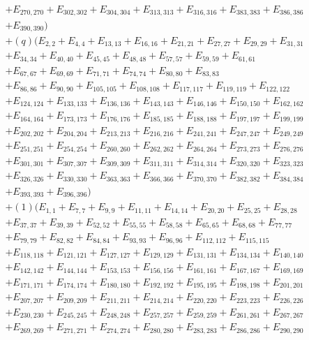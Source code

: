 \documentclass[pdftex]{sigma}
\numberwithin{equation}{section}
\theoremstyle{definition}
\begin{document}
\begin{align*}
&+E_{270,270}+E_{302,302}+E_{304,304}+E_{313,313}+E_{316,316}+E_{383,383}+E_{386,386}\\
&+E_{390,390})\\
&+(q)(E_{2,2}+E_{4,4}+E_{13,13}+E_{16,16}+E_{21,21}+E_{27,27}+E_{29,29}+E_{31,31}\\
&+E_{34,34}+E_{40,40}+E_{45,45}+E_{48,48}+E_{57,57}+E_{59,59}+E_{61,61}\\
&+E_{67,67}+E_{69,69}+E_{71,71}+E_{74,74}+E_{80,80}+E_{83,83}\\
&+E_{86,86}+E_{90,90}+E_{105,105}+E_{108,108}+E_{117,117}+E_{119,119}+E_{122,122}\\
&+E_{124,124}+E_{133,133}+E_{136,136}+E_{143,143}+E_{146,146}+E_{150,150}+E_{162,162}\\
&+E_{164,164}+E_{173,173}+E_{176,176}+E_{185,185}+E_{188,188}+E_{197,197}+E_{199,199}\\
&+E_{202,202}+E_{204,204}+E_{213,213}+E_{216,216}+E_{241,241}+E_{247,247}+E_{249,249}\\
&+E_{251,251}+E_{254,254}+E_{260,260}+E_{262,262}+E_{264,264}+E_{273,273}+E_{276,276}\\
&+E_{301,301}+E_{307,307}+E_{309,309}+E_{311,311}+E_{314,314}+E_{320,320}+E_{323,323}\\
&+E_{326,326}+E_{330,330}+E_{363,363}+E_{366,366}+E_{370,370}+E_{382,382}+E_{384,384}\\
&+E_{393,393}+E_{396,396})\\
&+(1)(E_{1,1}+E_{7,7}+E_{9,9}+E_{11,11}+E_{14,14}+E_{20,20}+E_{25,25}+E_{28,28}\\
&+E_{37,37}+E_{39,39}+E_{52,52}+E_{55,55}+E_{58,58}+E_{65,65}+E_{68,68}+E_{77,77}\\
&+E_{79,79}+E_{82,82}+E_{84,84}+E_{93,93}+E_{96,96}+E_{112,112}+E_{115,115}\\
&+E_{118,118}+E_{121,121}+E_{127,127}+E_{129,129}+E_{131,131}+E_{134,134}+E_{140,140}\\
&+E_{142,142}+E_{144,144}+E_{153,153}+E_{156,156}+E_{161,161}+E_{167,167}+E_{169,169}\\
&+E_{171,171}+E_{174,174}+E_{180,180}+E_{192,192}+E_{195,195}+E_{198,198}+E_{201,201}\\
&+E_{207,207}+E_{209,209}+E_{211,211}+E_{214,214}+E_{220,220}+E_{223,223}+E_{226,226}\\
&+E_{230,230}+E_{245,245}+E_{248,248}+E_{257,257}+E_{259,259}+E_{261,261}+E_{267,267}\\
&+E_{269,269}+E_{271,271}+E_{274,274}+E_{280,280}+E_{283,283}+E_{286,286}+E_{290,290}\\

\end{align*}
\end{document}
